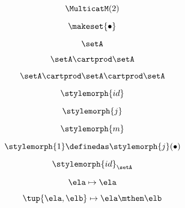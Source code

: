 {\begin{forslides}
    \begin{equation}
        \label{eq:slides_multicategories_35}
        \MulticatM(2)
    \end{equation}

    \begin{equation}
        \label{eq:slides_multicategories_36}
        \makeset{ \bullet }
    \end{equation}

    \begin{equation}
        \label{eq:slides_multicategories_37}
        \setA
    \end{equation}

    \begin{equation}
        \label{eq:slides_multicategories_38}
        \setA \cartprod \setA
    \end{equation}

    \begin{equation}
        \label{eq:slides_multicategories_39}
        \setA \cartprod \setA \cartprod \setA
    \end{equation}

    \begin{equation}
        \label{eq:slides_multicategories_40}
        \stylemorph{id}
    \end{equation}

    \begin{equation}
        \label{eq:slides_multicategories_41}
        \stylemorph{j}
    \end{equation}

    \begin{equation}
        \label{eq:slides_multicategories_42}
        \stylemorph{m}
    \end{equation}

    \begin{equation}
        \label{eq:slides_multicategories_43}
        \stylemorph{1} \definedas \stylemorph{j}(\bullet)
    \end{equation}

    \begin{equation}
        \label{eq:slides_multicategories_44}
        \stylemorph{id}_{\setA}
    \end{equation}

    \begin{equation}
        \label{eq:slides_multicategories_45}
        \ela \mapsto \ela
    \end{equation}

    \begin{equation}
        \label{eq:slides_multicategories_46}
        \tup{\ela, \elb} \mapsto \ela \mthen \elb
    \end{equation}


\end{forslides}}
